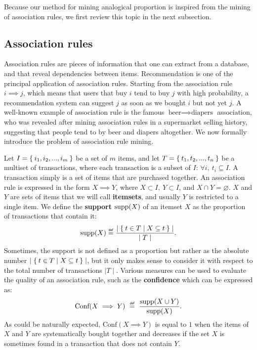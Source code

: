 Because our method for mining analogical proportion is inspired from the mining
of association rules, we first review this topic in the next subsection.

\subsection{Association rules}

Association rules are pieces of information that one can extract from a
database, and that reveal dependencies between items. Recommendation is one of
the principal application of association rules. Starting from the association
rule $i \implies j$, which means that users that buy $i$ tend to buy $j$ with
high probability, a recommendation system can suggest $j$ as soon as we bought
$i$ but not yet $j$. A well-known example of association rule is the famous
$\text{beer} \implies \text{diapers}$ association, who was revealed after
mining association rules in a supermarket selling history, suggesting that
people tend to by beer and diapers altogether. We now formally introduce the
problem of association rule mining.

Let $I = \Set{i_1, i_2, ..., i_m}$ be a set of $m$ items, and let $T =
\Set{t_1, t_2, ..., t_n}$ be a multiset of transactions, where each transaction
is a subset of $I$: $\forall i, ~ t_i \subseteq I$. A transaction simply is a set of items
that are purchased together. An association rule is expressed in the form $ X
\implies
Y$, where $ X \subset I, ~ Y \subset I$, and $X \cap Y = \varnothing$. $X$ and
$ Y $ are sets of items that we will call \textbf {itemsets}, and usually $Y$
is restricted to a single item. We define the \textbf{support} $\text{supp} (X) $ of
an itemset $X$ as the proportion of transactions that contain it:
$$\supp(X) \eqdef \frac{\mid \Set{t \in T | X \subseteq t}\mid}{\mid T \mid}.$$
Sometimes, the support is not defined as a proportion but rather as the
absolute number $\mid \Set{t \in T | X \subseteq t}\mid$, but it only makes
sense to consider it with respect to the total number of transactions $\mid T
\mid$. Various
measures can be used to evaluate the quality of an association rule, such as
the \textbf{confidence } which can be expressed as:
$$\text{Conf}(X \implies Y)~\eqdef~\frac{\supp (X \cup Y)}{\supp (X)}.$$
As could be naturally expected, $\text{Conf}(X \implies Y)$ is equal to $1$
when the items of $X$ and $Y$ are systematically bought together and decreases
if the set $X$ is sometimes found in a transaction that does not contain $Y$.

